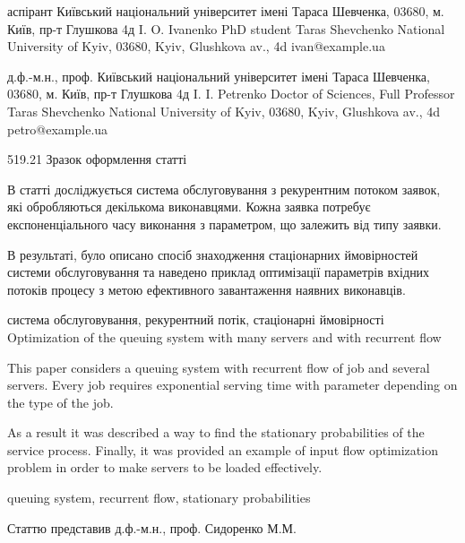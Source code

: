\documentclass{KnuBulletin}
\begin{document}


\author
{І. O. Іваненко} %
{аспірант} %
{Київський національний університет імені Тараса Шевченка, 03680, м. Київ, пр-т Глушкова 4д} %
{I. O. Ivanenko}
{PhD student}
{Taras Shevchenko National University of Kyiv, 03680, Kyiv, Glushkova av., 4d}
{ivan@example.ua} %

\author
{І. І. Петренко}
{д.ф.-м.н., проф.}
{Київський національний університет імені Тараса Шевченка, 03680, м. Київ, пр-т Глушкова 4д}
{I. I. Petrenko}
{Doctor of Sciences, Full Professor}
{Taras Shevchenko National University of Kyiv, 03680, Kyiv, Glushkova av., 4d}
{petro@example.ua}

\header
{519.21} %
{Зразок оформлення статті}
{
    В статті досліджується система обслуговування з рекурентним потоком заявок, які обробляються декількома виконавцями. Кожна заявка потребує експоненціального часу виконання з параметром, що залежить від типу заявки.

    В результаті, було описано спосіб знаходження стаціонарних ймовірностей  системи обслуговування та наведено приклад оптимізації параметрів вхідних потоків процесу з метою ефективного завантаження наявних виконавців. 
}
{система обслуговування, рекурентний потік, стаціонарні ймовірності}
{Optimization of the queuing system with many servers and with recurrent flow\\}
{
    This paper considers a queuing system with recurrent flow of job and several servers. Every job requires exponential serving time with parameter depending on the type of the job. 
    
    As a result it was described a way to find the stationary probabilities of the service process. Finally, it was provided an example of input flow optimization problem in order to make servers to be loaded effectively.
    \\
}
{queuing system, recurrent flow, stationary probabilities}

Статтю представив д.ф.-м.н., проф. Сидоренко М.М. 
\end{document}
